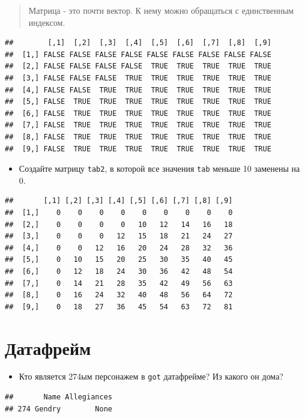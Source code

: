 \documentclass[]{book}
\providecommand{\tightlist}{%
  \setlength{\itemsep}{0pt}\setlength{\parskip}{0pt}}
\begin{document}
\begin{quote}
Матрица - это почти вектор. К нему можно обращаться с единственным индексом.
\end{quote}

\begin{verbatim}
##        [,1]  [,2]  [,3]  [,4]  [,5]  [,6]  [,7]  [,8]  [,9]
##  [1,] FALSE FALSE FALSE FALSE FALSE FALSE FALSE FALSE FALSE
##  [2,] FALSE FALSE FALSE FALSE  TRUE  TRUE  TRUE  TRUE  TRUE
##  [3,] FALSE FALSE FALSE  TRUE  TRUE  TRUE  TRUE  TRUE  TRUE
##  [4,] FALSE FALSE  TRUE  TRUE  TRUE  TRUE  TRUE  TRUE  TRUE
##  [5,] FALSE  TRUE  TRUE  TRUE  TRUE  TRUE  TRUE  TRUE  TRUE
##  [6,] FALSE  TRUE  TRUE  TRUE  TRUE  TRUE  TRUE  TRUE  TRUE
##  [7,] FALSE  TRUE  TRUE  TRUE  TRUE  TRUE  TRUE  TRUE  TRUE
##  [8,] FALSE  TRUE  TRUE  TRUE  TRUE  TRUE  TRUE  TRUE  TRUE
##  [9,] FALSE  TRUE  TRUE  TRUE  TRUE  TRUE  TRUE  TRUE  TRUE
\end{verbatim}

\begin{itemize}
\tightlist
\item
  Создайте матрицу \texttt{tab2}, в которой все значения \texttt{tab} меньше 10 заменены на 0.
\end{itemize}

\begin{verbatim}
##       [,1] [,2] [,3] [,4] [,5] [,6] [,7] [,8] [,9]
##  [1,]    0    0    0    0    0    0    0    0    0
##  [2,]    0    0    0    0   10   12   14   16   18
##  [3,]    0    0    0   12   15   18   21   24   27
##  [4,]    0    0   12   16   20   24   28   32   36
##  [5,]    0   10   15   20   25   30   35   40   45
##  [6,]    0   12   18   24   30   36   42   48   54
##  [7,]    0   14   21   28   35   42   49   56   63
##  [8,]    0   16   24   32   40   48   56   64   72
##  [9,]    0   18   27   36   45   54   63   72   81
\end{verbatim}

\hypertarget{df_task}{%
\section{Датафрейм}\label{df_task}}

\begin{itemize}
\tightlist
\item
  Кто является 274ым персонажем в \texttt{got} датафрейме? Из какого он дома?
\end{itemize}

\begin{verbatim}
##       Name Allegiances
## 274 Gendry        None
\end{verbatim}
\end{document}
